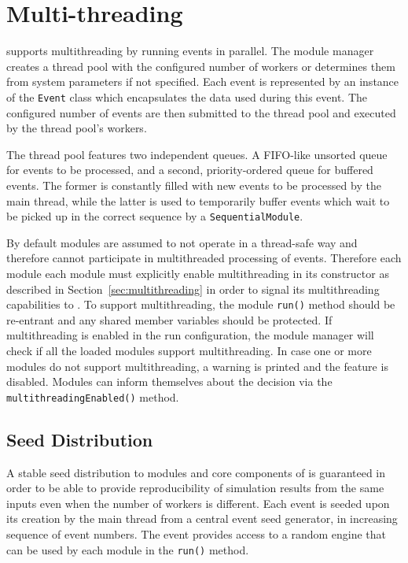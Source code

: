
\section{Multi-threading}
\label{sec:multithreading_approach}
\apsq supports multithreading by running events in parallel.
The module manager creates a thread pool with the configured number of workers or determines them from system parameters if not specified.
Each event is represented by an instance of the \texttt{Event} class which encapsulates the data used during this event.
The configured number of events are then submitted to the thread pool and executed by the thread pool's workers.

The thread pool features two independent queues.
A FIFO-like unsorted queue for events to be processed, and a second, priority-ordered queue for buffered events.
The former is constantly filled with new events to be processed by the main thread, while the latter is used to temporarily buffer events which wait to be picked up in the correct sequence by a \texttt{SequentialModule}.

By default modules are assumed to not operate in a thread-safe way and therefore cannot participate in multithreaded processing of events.
Therefore each module each module must explicitly enable multithreading in its constructor as described in Section~\ref{sec:multithreading} in order to signal its multithreading capabilities to \apsq.
To support multithreading, the module \texttt{run()} method should be re-entrant and any shared member variables should be protected.
If multithreading is enabled in the run configuration, the module manager will check if all the loaded modules support multithreading.
In case one or more modules do not support multithreading, a warning is printed and the feature is disabled. Modules can inform themselves about the decision via the \texttt{multithreadingEnabled()} method.

\subsection{Seed Distribution}
A stable seed distribution to modules and core components of \apsq is guaranteed in order to be able to provide reproducibility of simulation results from the same inputs even when the number of workers is different.
Each event is seeded upon its creation by the main thread from a central event seed generator, in increasing sequence of event numbers. The event provides access to a random engine that can be used by each module in the \texttt{run()} method.

